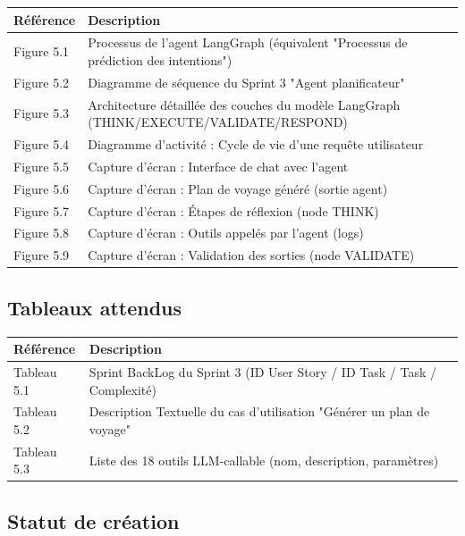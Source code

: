 \documentclass[12pt,a4paper]{article}
\begin{document}
\begin{longtable}{p{2cm} p{12cm}}
    \textbf{Référence} & \textbf{Description} \\
    \midrule
    \endhead
    
    Figure 5.1 & Processus de l'agent LangGraph (équivalent "Processus de prédiction des intentions") \\
    Figure 5.2 & Diagramme de séquence du Sprint 3 "Agent planificateur" \\
    Figure 5.3 & Architecture détaillée des couches du modèle LangGraph (THINK/EXECUTE/VALIDATE/RESPOND) \\
    Figure 5.4 & Diagramme d'activité : Cycle de vie d'une requête utilisateur \\
    Figure 5.5 & Capture d'écran : Interface de chat avec l'agent \\
    Figure 5.6 & Capture d'écran : Plan de voyage généré (sortie agent) \\
    Figure 5.7 & Capture d'écran : Étapes de réflexion (node THINK) \\
    Figure 5.8 & Capture d'écran : Outils appelés par l'agent (logs) \\
    Figure 5.9 & Capture d'écran : Validation des sorties (node VALIDATE) \\
    \bottomrule
\end{longtable}

\subsection*{Tableaux attendus}

\begin{longtable}{p{2cm} p{12cm}}
    \textbf{Référence} & \textbf{Description} \\
    \midrule
    \endhead
    
    Tableau 5.1 & Sprint BackLog du Sprint 3 (ID User Story / ID Task / Task / Complexité) \\
    Tableau 5.2 & Description Textuelle du cas d'utilisation "Générer un plan de voyage" \\
    Tableau 5.3 & Liste des 18 outils LLM-callable (nom, description, paramètres) \\
    \bottomrule
\end{longtable}

\subsection*{Statut de création}
\end{document}
